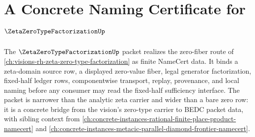 \chapter{A Concrete Naming Certificate for $\ZetaZeroTypeFactorizationUp$}
\label{ch:concrete-instances-zeta-zero-type-factorization-namecert}

The $\ZetaZeroTypeFactorizationUp$ packet realizes the zero-fiber route of \autoref{ch:visions-rh-zeta-zero-type-factorization} as finite NameCert data. It binds a zeta-domain source row, a displayed zero-value fiber, legal generator factorization, fixed-half ledger rows, componentwise transport, replay, provenance, and local naming before any consumer may read the fixed-half sufficiency interface. The packet is narrower than the analytic zeta carrier and wider than a bare zero row: it is a concrete bridge from the vision's zero-type carrier to BEDC packet data, with sibling context from \autoref{ch:concrete-instances-rational-finite-place-product-namecert} and \autoref{ch:concrete-instances-metacic-parallel-diamond-frontier-namecert}.



